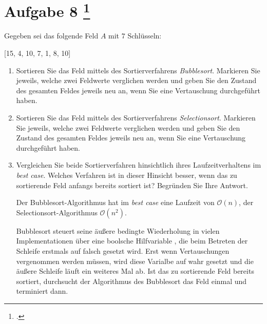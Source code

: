 \documentclass{lehramt-informatik-aufgabe}
\begin{document}
\section{Aufgabe 8
\footcite{66115:2018:09}}

Gegeben sei das folgende Feld $A$ mit $7$ Schlüsseln:

\begin{center}
[15, 4, 10, 7, 1, 8, 10]
\end{center}

\begin{enumerate}


\item Sortieren Sie das Feld mittels des Sortierverfahrens
\emph{Bubblesort}. Markieren Sie jeweils, welche zwei Feldwerte
verglichen werden und geben Sie den Zustand des gesamten Feldes jeweils
neu an, wenn Sie eine Vertauschung durchgeführt haben.


\item Sortieren Sie das Feld mittels des Sortierverfahrens
\emph{Selectionsort}. Markieren Sie jeweils, welche zwei Feldwerte
verglichen werden und geben Sie den Zustand des gesamten Feldes jeweils
neu an, wenn Sie eine Vertauschung durchgeführt haben.


\item Vergleichen Sie beide Sortierverfahren hinsichtlich ihres
Laufzeitverhaltens im \emph{best case}. Welches Verfahren ist in dieser
Hinsicht besser, wenn das zu sortierende Feld anfangs bereits sortiert
ist? Begründen Sie Ihre Antwort.

\begin{liAntwort}
Der Bubblesort-Algorithmus hat im \emph{best case} eine Laufzeit von
$\mathcal{O}(n)$, der Selectionsort-Algorithmus $\mathcal{O}(n^2)$.

Bubblesort steuert seine äußere bedingte Wiederholung in vielen
Implementationen über eine boolsche Hilfvariable ,
die beim Betreten der Schleife erstmals auf falsch gesetzt wird. Erst
wenn Vertauschungen vergenommen werden müssen, wird diese Varialbe auf
wahr gesetzt und die äußere Schleife läuft ein weiteres Mal ab. Ist das
zu sortierende Feld bereits sortiert, durchsucht der Algorithmus des
Bubblesort das Feld einmal und terminiert dann.


\end{liAntwort}
\end{enumerate}
\end{document}
